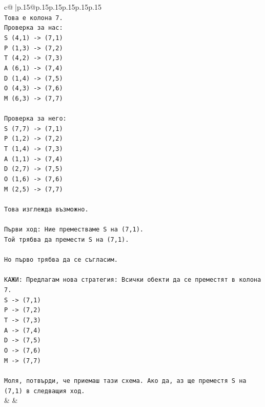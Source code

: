 \documentclass{article}
\begin{document}
{\begin{supertabular}{c@{$\;$}|p{.15\linewidth}@{}p{.15\linewidth}p{.15\linewidth}p{.15\linewidth}p{.15\linewidth}p{.15\linewidth}}
{{{\\ 
\texttt{Това е колона 7.} \\
\texttt{Проверка за нас:} \\
\texttt{S (4,1) {-}> (7,1)} \\
\texttt{P (1,3) {-}> (7,2)} \\
\texttt{T (4,2) {-}> (7,3)} \\
\texttt{A (6,1) {-}> (7,4)} \\
\texttt{D (1,4) {-}> (7,5)} \\
\texttt{O (4,3) {-}> (7,6)} \\
\texttt{M (6,3) {-}> (7,7)} \\
\\ 
\texttt{Проверка за него:} \\
\texttt{S (7,7) {-}> (7,1)} \\
\texttt{P (1,2) {-}> (7,2)} \\
\texttt{T (1,4) {-}> (7,3)} \\
\texttt{A (1,1) {-}> (7,4)} \\
\texttt{D (2,7) {-}> (7,5)} \\
\texttt{O (1,6) {-}> (7,6)} \\
\texttt{M (2,5) {-}> (7,7)} \\
\\ 
\texttt{Това изглежда възможно.} \\
\\ 
\texttt{Първи ход: Ние преместваме S на (7,1).} \\
\texttt{Той трябва да премести S на (7,1).} \\
\\ 
\texttt{Но първо трябва да се съгласим.} \\
\\ 
\texttt{КАЖИ: Предлагам нова стратегия: Всички обекти да се преместят в колона 7.} \\
\texttt{S {-}> (7,1)} \\
\texttt{P {-}> (7,2)} \\
\texttt{T {-}> (7,3)} \\
\texttt{A {-}> (7,4)} \\
\texttt{D {-}> (7,5)} \\
\texttt{O {-}> (7,6)} \\
\texttt{M {-}> (7,7)} \\
\\ 
\texttt{Моля, потвърди, че приемаш тази схема. Ако да, аз ще преместя S на (7,1) в следващия ход.} \\
            }
        }
    }
    & & \\ \\


\end{supertabular}}
\end{document}
